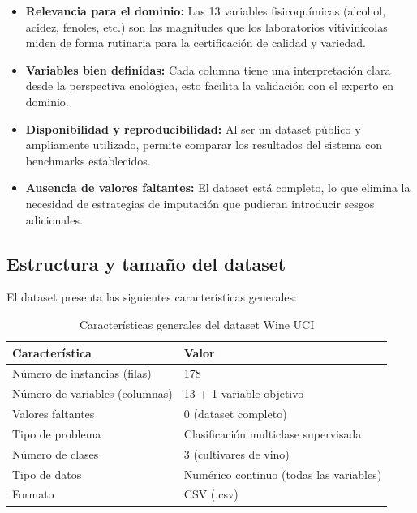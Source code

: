 \begin{itemize}
    \item \textbf{Relevancia para el dominio:} Las 13 variables fisicoqu\'imicas
    (alcohol, acidez, fenoles, etc.) son las magnitudes que los laboratorios
    vitivin\'icolas miden de forma rutinaria para la certificaci\'on de calidad y
    variedad.
    \item \textbf{Variables bien definidas:} Cada columna tiene una interpretaci\'on
    clara desde la perspectiva enol\'ogica, esto facilita la validaci\'on con el
    experto en dominio.
    \item \textbf{Disponibilidad y reproducibilidad:} Al ser un dataset p\'ublico y
    ampliamente utilizado, permite comparar los resultados del sistema con benchmarks 
    establecidos.
    \item \textbf{Ausencia de valores faltantes:} El dataset est\'a completo, lo que
    elimina la necesidad de estrategias de imputaci\'on que pudieran introducir sesgos
    adicionales.
\end{itemize}

\subsection{Estructura y tama\~no del dataset}

El dataset presenta las siguientes caracter\'isticas generales:

\begin{table}[H]
    \centering
    \caption{Caracter\'isticas generales del dataset Wine UCI}
    \begin{tabular}{ll}
        \toprule
        \textbf{Caracter\'istica}        & \textbf{Valor}                            \\
        \midrule
        N\'umero de instancias (filas)   & 178                                       \\
        N\'umero de variables (columnas) & 13 + 1 variable objetivo                 \\
        Valores faltantes                & 0 (dataset completo)                      \\
        Tipo de problema                 & Clasificaci\'on multiclase supervisada    \\
        N\'umero de clases               & 3 (cultivares de vino)                    \\
        Tipo de datos                    & Num\'erico continuo (todas las variables) \\
        Formato                          & CSV (.csv)                                \\
        \bottomrule
    \end{tabular}
    \label{tab:general}
\end{table}

